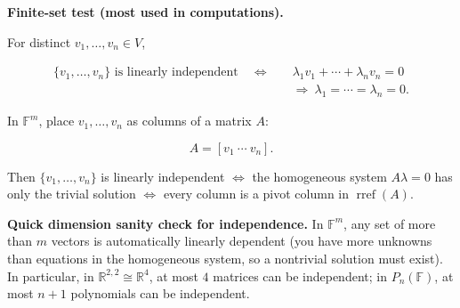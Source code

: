 \begin{keyformula}

\textbf{Finite-set test (most used in computations).}

For distinct $v_1,\ldots,v_n\in V$,

\[
\begin{aligned}
\{v_1,\ldots,v_n\}\text{ is linearly independent}
\quad\Longleftrightarrow\quad&
\lambda_1 v_1+\cdots+\lambda_n v_n=0\\
&\Rightarrow\ \lambda_1=\cdots=\lambda_n=0.
\end{aligned}
\]

In $\mathbb{F}^m$, place $v_1,\ldots,v_n$ as columns of a matrix $A$:

\[
A=[v_1\ \cdots\ v_n].
\]

Then $\{v_1,\ldots,v_n\}$ is linearly independent $\Longleftrightarrow$ the homogeneous system $A\lambda=0$ has only the trivial solution $\Longleftrightarrow$ every column is a pivot column in $\operatorname{rref}(A)$.

\end{keyformula}

\begin{examtip}
\textbf{Quick dimension sanity check for independence.}
In $\mathbb{F}^m$, any set of more than $m$ vectors is automatically linearly dependent (you have more unknowns than equations in the homogeneous system, so a nontrivial solution must exist).
In particular, in $\mathbb{R}^{2,2}\cong\mathbb{R}^4$, at most $4$ matrices can be independent; in $P_n(\mathbb{F})$, at most $n+1$ polynomials can be independent.
\end{examtip}

